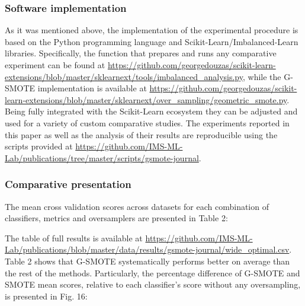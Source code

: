 \documentclass[parskip=full]{scrartcl}
\begin{document}
\subsubsection{Software implementation}

As it was mentioned above, the implementation of the experimental procedure is based on the Python programming language and Scikit-Learn/Imbalanced-Learn libraries. Specifically, the function that prepares and runs any comparative experiment can be found at \url{https://github.com/georgedouzas/scikit-learn-extensions/blob/master/sklearnext/tools/imbalanced_analysis.py}, while the G-SMOTE implementation is available at \url{https://github.com/georgedouzas/scikit-learn-extensions/blob/master/sklearnext/over_sampling/geometric_smote.py}. Being fully integrated with the Scikit-Learn ecosystem they can be adjusted and used for a variety of custom comparative studies. The experiments reported in this paper as well as the analysis of their results are reproducible using the scripts provided at \url{https://github.com/IMS-ML-Lab/publications/tree/master/scripts/gsmote-journal}.

\subsubsection{Comparative presentation}

The mean cross validation scores across datasets for each combination of classifiers, metrics and oversamplers are presented in Table 2:


The table of full results is available at \url{https://github.com/IMS-ML-Lab/publications/blob/master/data/results/gsmote-journal/wide_optimal.csv}. Table 2 shows that G-SMOTE systematically performs better on average than the rest of the methods. Particularly, the percentage difference of G-SMOTE and SMOTE mean scores, relative to each classifier's score without any oversampling, is presented in Fig. 16:
\end{document}
